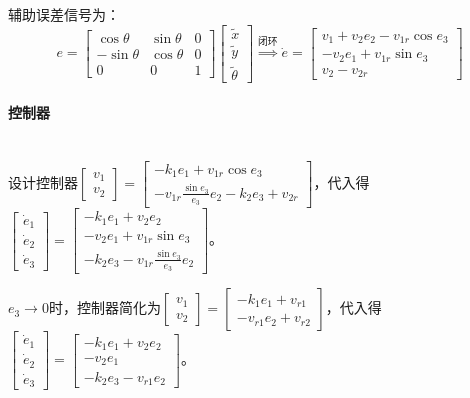 \documentclass[
12pt, %
a4paper, 
oneside, %
]{scrartcl}
\begin{document}
辅助误差信号为：
$$ e = \begin{bmatrix} \cos\theta & \sin\theta & 0 \\ -\sin\theta & \cos\theta & 0 \\ 0 & 0 & 1 \end{bmatrix} \begin{bmatrix} \tilde{x} \\ \tilde{y} \\ \tilde{\theta} \end{bmatrix} \overset{\text{闭环}}{\Longrightarrow} \dot{e} = \begin{bmatrix} v_1 + v_2 e_2 - v_{1r} \cos e_3 \\ - v_2 e_1 + v_{1r} \sin e_3 \\ v_2 - v_{2r} \end{bmatrix} $$
\paragraph{控制器}~\\

设计控制器$ \begin{bmatrix} v_1 \\ v_2 \end{bmatrix} = \begin{bmatrix} -k_1 e_1 + v_{1r} \cos e_3 \\ -v_{1r} \frac{\sin e_3}{e_3} e_2 - k_2 e_3 + v_{2r} \end{bmatrix} $，代入得$ \begin{bmatrix} \dot{e}_1 \\ \dot{e}_2 \\ \dot{e}_3 \end{bmatrix} = \begin{bmatrix} -k_1 e_1 + v_2 e_2 \\ -v_2 e_1 + v_{1r} \sin e_3 \\ -k_2 e_3 - v_{1r} \frac{\sin e_3}{e_3} e_2 \end{bmatrix} $。

$ e_3 \to 0 $时，控制器简化为$ \begin{bmatrix} v_1 \\ v_2 \end{bmatrix} = \begin{bmatrix} -k_1 e_1 + v_{r1} \\ -v_{r1}  e_2 + v_{r2} \end{bmatrix} $，代入得$ \begin{bmatrix} \dot{e}_1 \\ \dot{e}_2 \\ \dot{e}_3 \end{bmatrix} = \begin{bmatrix} -k_1 e_1 + v_2 e_2 \\ -v_2 e_1 \\ -k_2 e_3 - v_{r1} e_2 \end{bmatrix} $。
\end{document}
